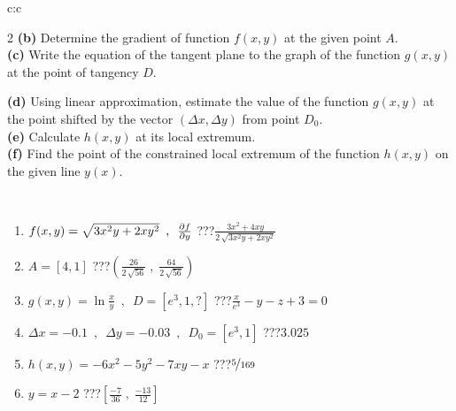 \documentclass[10pt]{report}
\begin{document}
\begin{tabular}{c:c}
\begin{minipage}[c][104.5mm][t]{0.5\linewidth}
\begin{center}
\begin{minipage}{0.95\linewidth}
\begin{center}
{\begin{multicols}{2}
\textbf{(b)} Determine the gradient of function \(f(x,y)\) at the given point \(A\). \\[1mm]
\textbf{(c)} Write the equation of the tangent plane to the graph of the function \(g(x,y)\) at the point of tangency \(D\). \par \columnbreak
\textbf{(d)} Using linear approximation, estimate the value of the function \(g(x,y)\) at the point shifted by the vector \((\Delta x, \Delta y)\) from point \(D_0\). \\[1mm]
\textbf{(e)} Calculate \(h(x,y)\) at its local extremum. \\[1mm]
\textbf{(f)} Find the point of the constrained local extremum of the function \(h(x,y)\) on the given line \(y(x)\). \\[1mm]
\end{multicols}
}
\end{center}
\end{minipage}
\\[4mm]
\begin{minipage}{0.79\linewidth}
\begin{center}
\begin{varwidth}{\linewidth}
\begin{enumerate}
\normalsizerr
\item $f(x,y) = \sqrt{3x^2y + 2xy^2}\enspace , \enspace \pdv{f}{y}$\quad \dotfill\; ???\;\dotfill \quad $\frac{3x^2+4xy}{2\,\sqrt{3x^2y+2xy^2}}$
\item $A = [4, 1]$\quad \dotfill\; ???\;\dotfill \quad $\left( \frac{26}{2\,\sqrt{56}} \;,\; \frac{64}{2\,\sqrt{56}} \right)$
\item $g(x,y) = \ln\frac{x}{y} \enspace , \enspace D=[e^{3},1,?]$\quad \dotfill\; ???\;\dotfill \quad $\frac{x}{e^3} - y - z + 3 = 0$
\item $\Delta x = {-0.1} \enspace,\enspace \Delta y = {-0.03} \enspace,\enspace D_0 = [e^{3},1]$\quad \dotfill\; ???\;\dotfill \quad $3.025$
\item $h(x,y) = -6x^2-5y^2-7xy-x$\quad \dotfill\; ???\;\dotfill \quad $\nicefrac{5}{169}$
\item $y = x-2$\quad \dotfill\; ???\;\dotfill \quad $\left[\frac{-7}{36}\;,\;\frac{-13}{12}\right]$
\end{enumerate}
\end{varwidth}
\end{center}
\end{minipage}
\begin{minipage}{0.20\linewidth}
\begin{center}

\end{center}
\end{minipage}
\end{center}
\end{minipage}
\end{tabular}
\end{document}
